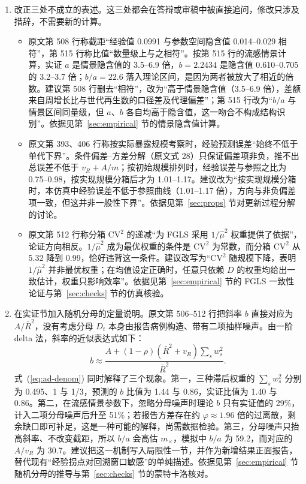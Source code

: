 \begin{enumerate}
\item 改正三处不成立的表述。这三处都会在答辩或审稿中被直接追问，修改只涉及措辞，不需要新的计算。
\begin{itemize}
\item 原文第 508 行称截距“经验值 0.0991 与参数空间隐含值 0.014--0.029 相符”，第 515 行称比值“数量级上与之相符”。按第 515 行的流感情景计算，实证 $a$ 是情景隐含值的 3.5--6.9 倍，$b=2.2434$ 是隐含值 0.610--0.705 的 3.2--3.7 倍；$b/a=22.6$ 落入理论区间，是因为两者被放大了相近的倍数。建议第 508 行删去“相符”，改为“高于情景隐含值（3.5--6.9 倍），差额来自周增长比与世代再生数的口径差及代理偏差”；第 515 行改为“$b/a$ 与情景区间同量级，但 $a$、$b$ 各自均高于隐含值，这一吻合不构成结构识别”。依据见第~\ref{sec:empirical} 节的情景隐含值计算。
\item 原文第 393、406 行称按实际暴露规模考察时，经验预测误差“始终不低于单代下界”。条件偏差--方差分解（原文式 28）只保证偏差项非负，推不出总误差不低于 $v_R+A/m$；按初始规模排列时，经验误差与参照之比为 0.75--0.98，按实现规模分箱后才为 1.01--1.17。建议改为“按实现规模分箱时，本仿真中经验误差不低于参照曲线（1.01--1.17 倍），方向与非负偏差项一致，但这并非一般性下界”。依据见第~\ref{sec:props} 节对更新过程分解的讨论。
\item 原文第 512 行称分箱 $\mathrm{CV}^2$ 的递减“为 FGLS 采用 $1/\hat\mu^2$ 权重提供了依据”，论证方向相反。$1/\hat\mu^2$ 成为最优权重的条件是 $\mathrm{CV}^2$ 为常数，而分箱 $\mathrm{CV}^2$ 从 5.32 降到 0.99，恰好违背这一条件。建议改写为“$\mathrm{CV}^2$ 随规模下降，表明 $1/\hat\mu^2$ 并非最优权重；在均值设定正确时，任意只依赖 $D$ 的权重均给出一致估计，权重只影响效率”。依据见第~\ref{sec:empirical} 节的 FGLS 一致性论证与第~\ref{sec:checks} 节的仿真核验。
\end{itemize}

\item 在实证节加入随机分母的定量说明。原文第 506--512 行把斜率 $b$ 直接对应为 $A/\bar R^2$，没有考虑分母 $D_t$ 本身由报告病例构造、带有二项抽样噪声。由一阶 delta 法，斜率的近似表达式如下：
\begin{equation}\label{eq:ad-denom}
b\approx\frac{A+(1-\rho)(\bar R^2+v_R)\sum_s w_s^2}{\bar R^2}.
\end{equation}
式~(\ref{eq:ad-denom}) 同时解释了三个现象。第一，三种滞后权重的 $\sum_s w_s^2$ 分别为 0.495、1 与 1/3，预测的 $b$ 比值为 1.44 与 0.86，实证比值为 1.40 与 0.86。第二，在流感情景参数下，忽略分母噪声时理论 $b$ 只有实证值的 29\%，计入二项分母噪声后升至 51\%；若报告方差存在约 $\varphi\approx1.96$ 倍的过离散，剩余缺口即可补足，这是一种可能的解释，尚需数据检验。第三，分母噪声只抬高斜率、不改变截距，所以 $b/a$ 会高估 $m_\times$，模拟中 $b/a$ 为 59.2，而对应的 $A/v_R$ 为 30.7。建议把这一机制写入局限性一节，并作为新增结果正面报告，替代现有“经验拐点对回溯窗口敏感”的单纯描述。依据见第~\ref{sec:empirical} 节随机分母的推导与第~\ref{sec:checks} 节的蒙特卡洛核对。


\end{enumerate}
